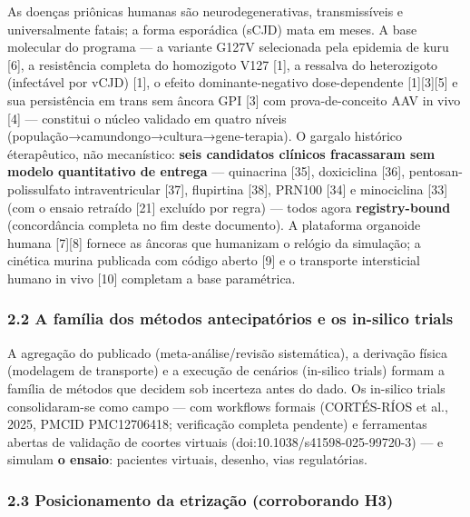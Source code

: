 \documentclass[
  10pt,
]{article}
\begin{document}
As doenças priônicas humanas são neurodegenerativas, transmissíveis e
universalmente fatais; a forma esporádica (sCJD) mata em meses. A base
molecular do programa --- a variante G127V selecionada pela epidemia de
kuru {[}6{]}, a resistência completa do homozigoto V127 {[}1{]}, a
ressalva do heterozigoto (infectável por vCJD) {[}1{]}, o efeito
dominante-negativo dose-dependente {[}1{]}{[}3{]}{[}5{]} e sua
persistência em trans sem âncora GPI {[}3{]} com prova-de-conceito AAV
in vivo {[}4{]} --- constitui o núcleo validado em quatro níveis
(população→camundongo→cultura→gene-terapia). O gargalo histórico
éterapêutico, não mecanístico: \textbf{seis candidatos clínicos
fracassaram sem modelo quantitativo de entrega} --- quinacrina {[}35{]},
doxiciclina {[}36{]}, pentosan-polissulfato intraventricular {[}37{]},
flupirtina {[}38{]}, PRN100 {[}34{]} e minociclina {[}33{]} (com o
ensaio retraído {[}21{]} excluído por regra) --- todos agora
\textbf{registry-bound} (concordância completa no fim deste documento).
A plataforma organoide humana {[}7{]}{[}8{]} fornece as âncoras que
humanizam o relógio da simulação; a cinética murina publicada com código
aberto {[}9{]} e o transporte intersticial humano in vivo {[}10{]}
completam a base paramétrica.

\hypertarget{a-famuxedlia-dos-muxe9todos-antecipatuxf3rios-e-os-in-silico-trials}{%
\subsubsection{2.2 A família dos métodos antecipatórios e os in-silico
trials}\label{a-famuxedlia-dos-muxe9todos-antecipatuxf3rios-e-os-in-silico-trials}}

A agregação do publicado (meta-análise/revisão sistemática), a derivação
física (modelagem de transporte) e a execução de cenários (in-silico
trials) formam a família de métodos que decidem sob incerteza antes do
dado. Os in-silico trials consolidaram-se como campo --- com workflows
formais (CORTÉS-RÍOS et al., 2025, PMCID PMC12706418; verificação
completa pendente) e ferramentas abertas de validação de coortes
virtuais (doi:10.1038/s41598-025-99720-3) --- e simulam \textbf{o
ensaio}: pacientes virtuais, desenho, vias regulatórias.

\hypertarget{posicionamento-da-etrizauxe7uxe3o-corroborando-h3}{%
\subsubsection{2.3 Posicionamento da etrização (corroborando
H3)}\label{posicionamento-da-etrizauxe7uxe3o-corroborando-h3}}
\end{document}
